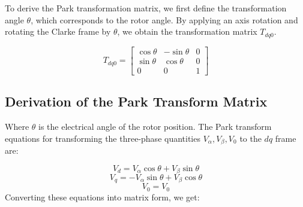 To derive the Park transformation matrix, we first define the transformation
angle \( \theta \), which corresponds to the rotor angle. By applying an axis
rotation and rotating the Clarke frame by \( \theta \), we obtain the
transformation matrix \( T_{dq0} \).

\begin{equation*}
    T_{dq0} =
    \begin{bmatrix}
        \cos \theta & -\sin \theta & 0 \\
        \sin \theta & \cos \theta  & 0 \\
        0           & 0            & 1
    \end{bmatrix}
\end{equation*}

\subsection{Derivation of the Park Transform Matrix}

\noindent
Where \( \theta \) is the electrical angle of the rotor position.
\noindent
The Park transform equations for transforming the three-phase quantities \(
V_\alpha, V_\beta, V_0 \) to the \( dq \) frame are:

\begin{equation*}
    V_d = V_\alpha \cos \theta + V_\beta \sin \theta
\end{equation*}
\begin{equation*}
    V_q = -V_\alpha \sin \theta + V_\beta \cos \theta
\end{equation*}
\begin{equation*}
    V_0 = V_0
\end{equation*}
\noindent
Converting these equations into matrix form, we get:

